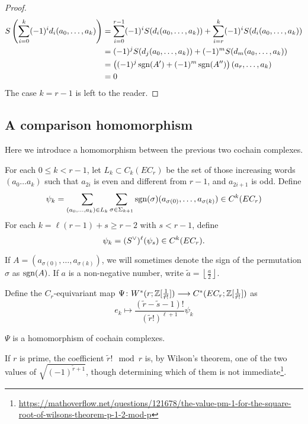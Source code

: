 \begin{proof}
	\begin{align*}
		S\left(\sum_{i=0}^k (-1)^id_i (a_0,\ldots,a_k)\right)
		&= \sum_{i=0}^{r-1} (-1)^iS(d_i (a_0,\ldots,a_k)) + \sum_{i=r}^{k} (-1)^iS(d_i (a_0,\ldots,a_k)) \\
		&= (-1)^jS(d_j (a_0,\ldots,a_k)) + (-1)^mS(d_m (a_0,\ldots,a_k)) \\
		&= \left((-1)^{j}\operatorname*{sgn}(A') + (-1)^m\operatorname*{sgn}(A'')\right)(a_r,\ldots,a_k)\\
		&= 0
	\end{align*}
	The case $k=r-1$ is left to the reader.
\end{proof}

\subsection{A comparison homomorphism}

Here we introduce a homomorphism between the previous two cochain complexes.

\begin{definition}
	For each $0\leq k<r-1$, let $L_k\subset C_k(EC_r)$ be the set of those increasing words $(a_0\ldots a_k)$ such that $a_{2i}$ is even and different from $r-1$, and $a_{2i+1}$ is odd. Define
	\begin{equation}\label{eq:111}
		\psi_k = \sum_{(a_0,\ldots,a_k)\in L_k}\sum_{\sigma\in \Sigma_{k+1}} \operatorname*{sgn}(\sigma)(a_{\sigma(0)},\ldots,a_{\sigma(k)})\in C^k(EC_r)
	\end{equation}
	For each $k = \ell (r-1) + s\geq r-2$ with $s<r-1$, define
	\begin{equation}\label{eq:112}
		\psi_{k} = ({S}^{\vee})^\ell(\psi_s)\in C^k(EC_r).
	\end{equation}
\end{definition}

\begin{notation}
	If $A= (a_{\sigma(0)},\ldots,a_{\sigma(k)})$, we will sometimes denote the sign of the permutation $\sigma$ as $\operatorname*{sgn}(A)$. If $a$ is a non-negative number, write $\tilde{a} = \left\lfloor \frac{a}{2}\right\rfloor$.
\end{notation}

Define the $C_r$-equivariant map $\Psi\colon W^*(r;\mathbb{Z}[\frac{1}{\tilde{r}!}])\longrightarrow C^*(EC_r; \mathbb{Z}[\frac{1}{\tilde{r}!}])$ as
\[e_k\mapsto \frac{(\tilde{r}-\tilde{s}-1)!}{(\tilde{r}!)^{\ell+1}}\psi_k\]

\begin{theorem}
	$\Psi$ is a homomorphism of cochain complexes.
\end{theorem}
\begin{remark}
	If $r$ is prime, the coefficient $\tilde{r}!\mod r$ is, by Wilson's theorem, one of the two values of $\sqrt{(-1)^{\tilde{r}+1}}$, though determining which of them is not immediate\footnote{\url{https://mathoverflow.net/questions/121678/the-value-pm-1-for-the-square-root-of-wilsons-theorem-p-1-2-mod-p}}.
\end{remark}

